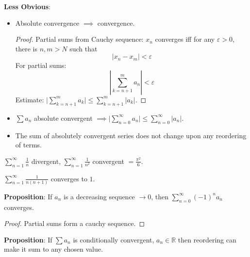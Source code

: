 \documentclass{report}
\begin{document}
\textbf{Less Obvious}:
    \begin{itemize}
        \item Absolute convergence $\implies$ convergence.
            \begin{proof}
                Partial sums from Cauchy sequence: $x_{n}$ converges iff for any $\varepsilon > 0$, there is $n, m > N$ such that 
                    \begin{equation*}
                        \lvert x_{n} - x_{m} \rvert < \varepsilon
                    \end{equation*}
                For partial sums:
                    \begin{equation*}
                        \left\lvert \sum_{k = n + 1}^{m} a_{n} \right\rvert < \varepsilon
                    \end{equation*}
                Estimate: $\lvert \sum_{k = n + 1}^{m} a_{k} \rvert \leq \sum_{k = n + 1}^{m} \lvert a_{k} \rvert$. 
            \end{proof}

        \item $\sum a_{n}$ absolute convergent $\implies \lvert \sum_{n = 0}^{\infty} a_{n} \rvert \leq \sum_{n = 0}^{\infty}\lvert a_{n} \rvert$.

        \item The sum of absolutely convergent series does not change upon any reordering of terms.
    \end{itemize}

\begin{examples}
    \begin{example}
        $\sum_{n = 1}^{\infty} \frac{1}{n}$ divergent, $\sum_{n = 1}^{\infty}\frac{1}{n^{2}}$ convergent $= \frac{\pi^{2}}{6}$.
    \end{example}
    \begin{example}
        $\sum_{n = 1}^{\infty} \frac{1}{n(n + 1)}$ converges to $1$.
    \end{example}
\end{examples}

\textbf{Proposition}: If $a_{n}$ is a decreasing sequence $ \rightarrow 0$, then $\sum_{n = 0}^{\infty} (-1)^{n} a_{n}$ converges.
    \begin{proof}
        Partial sums form a cauchy sequence.
    \end{proof}

\textbf{Proposition}: If $\sum a_{n}$ is conditionally convergent, $a_{n} \in \mathbb{R}$ then reordering can make it sum to any chosen value.
\end{document}
